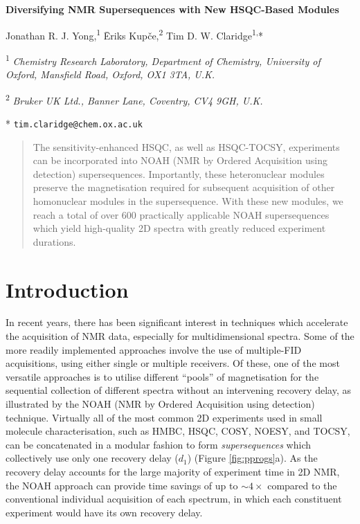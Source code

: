 \documentclass[draft,11pt]{article}
\newcommand*{\proton}{\ce{^{1}H}}
\newcommand*{\figref}[1]{Figure \ref{fig:#1}}
\begin{document}
\begin{center}
    \Large \textbf{Diversifying NMR Supersequences with New HSQC-Based Modules}

    \vspace{0.2cm}

    \large Jonathan R. J. Yong,\textsuperscript{1} {\=E}riks Kup{\v{c}}e,\textsuperscript{2} Tim D. W. Claridge\textsuperscript{1,}*

    \vspace{0.2cm}

    \normalsize

    \textsuperscript{1} \textit{Chemistry Research Laboratory, Department of Chemistry, University of Oxford, Mansfield Road, Oxford, OX1 3TA, U.K.}

    \textsuperscript{2} \textit{Bruker UK Ltd., Banner Lane, Coventry, CV4 9GH, U.K.}

    * \texttt{tim.claridge@chem.ox.ac.uk}
\end{center}

\vspace{0.5cm}

\begin{abstract}
    The sensitivity-enhanced HSQC, as well as HSQC-TOCSY, experiments can be incorporated into NOAH (NMR by Ordered Acquisition using \proton{} detection) supersequences.
    Importantly, these heteronuclear modules preserve the magnetisation required for subsequent acquisition of other homonuclear modules in the supersequence.
    With these new modules, we reach a total of over 600 practically applicable NOAH supersequences which yield high-quality 2D spectra with greatly reduced experiment durations.
\end{abstract}

\section*{Introduction}

In recent years, there has been significant interest in techniques which accelerate the acquisition of NMR data, especially for multidimensional spectra.\autocite{ultrafast, timeshared, multireceive}
Some of the more readily implemented approaches involve the use of multiple-FID acquisitions, using either single or multiple receivers.
Of these, one of the most versatile approaches is to utilise different ``pools'' of magnetisation for the sequential collection of different spectra without an intervening recovery delay, as illustrated by the NOAH (NMR by Ordered Acquisition using \proton{} detection) technique.\autocite{noah}
Virtually all of the most common 2D experiments used in small molecule characterisation, such as HMBC, HSQC, COSY, NOESY, and TOCSY, can be concatenated in a modular fashion to form \textit{supersequences} which collectively use only one recovery delay ($d_1$) (\figref{pprogs}a).
As the recovery delay accounts for the large majority of experiment time in 2D NMR, the NOAH approach can provide time savings of up to $\sim 4\times$ compared to the conventional individual acquisition of each spectrum, in which each constituent experiment would have its own recovery delay.
\end{document}
